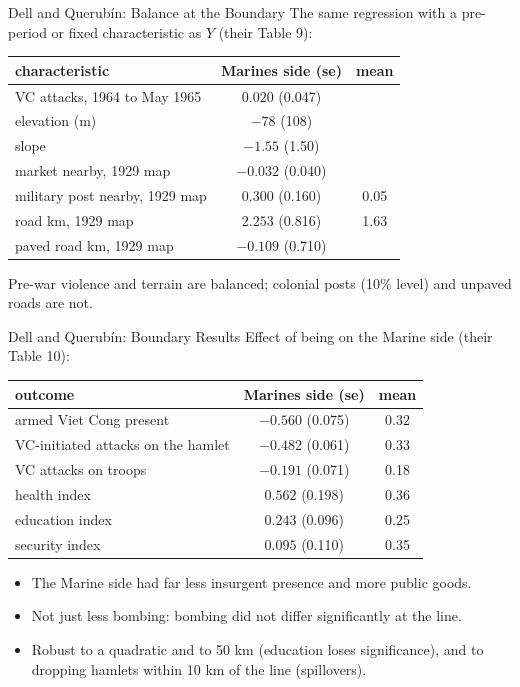 \documentclass[aspectratio=169,11pt,xcolor=dvipsnames]{beamer}
\begin{document}
\begin{frame}{Dell and Querubín: Balance at the Boundary}
The same regression with a pre-period or fixed characteristic as $Y$ (their Table 9):
\begin{center}\footnotesize
\renewcommand{\arraystretch}{1.08}
\begin{tabular}{@{}lcc@{}}
\toprule
characteristic & Marines side (se) & mean \\
\midrule
VC attacks, 1964 to May 1965 & $0.020$ (0.047) & \\
elevation (m) & $-78$ (108) & \\
slope & $-1.55$ (1.50) & \\
market nearby, 1929 map & $-0.032$ (0.040) & \\
military post nearby, 1929 map & \alert{$0.300$ (0.160)} & 0.05 \\
road km, 1929 map & \alert{$2.253$ (0.816)} & 1.63 \\
paved road km, 1929 map & $-0.109$ (0.710) & \\
\bottomrule
\end{tabular}
\end{center}
\vskip1pt
{\small Pre-war violence and terrain are balanced; colonial posts (10\% level) and
unpaved roads are not.}
\end{frame}

\begin{frame}{Dell and Querubín: Boundary Results}
Effect of being on the Marine side (their Table 10):
\vskip3pt
\begin{center}\small
\renewcommand{\arraystretch}{1.1}
\begin{tabular}{@{}lcc@{}}
\toprule
outcome & Marines side (se) & mean \\
\midrule
armed Viet Cong present & $-0.560$ (0.075) & 0.32 \\
VC-initiated attacks on the hamlet & $-0.482$ (0.061) & 0.33 \\
VC attacks on troops & $-0.191$ (0.071) & 0.18 \\
health index & $0.562$ (0.198) & 0.36 \\
education index & $0.243$ (0.096) & 0.25 \\
security index & $0.095$ (0.110) & 0.35 \\
\bottomrule
\end{tabular}
\end{center}
\vskip2pt
\begin{itemize}\itemsep2pt
  \item The Marine side had far less insurgent presence and more public goods.
  \item Not just less bombing: bombing did not differ significantly at the line.
  \item Robust to a quadratic and to 50 km (education loses significance), and
        to dropping hamlets within 10 km of the line (spillovers).
\end{itemize}
\end{frame}
\end{document}
